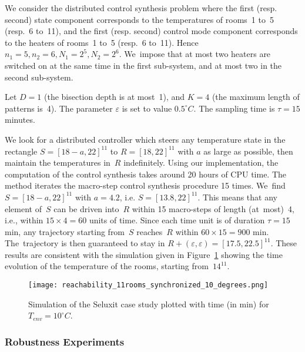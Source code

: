 We consider the distributed control synthesis problem where
the first (resp. second) state component corresponds to 
the temperatures of rooms~1 to~5 (resp.~6 to~11),
and the first (resp. second) control mode component corresponds to the heaters 
of rooms~1 to~5 (resp.~6 to~11).
Hence $n_1=5, n_2=6, N_1=2^5, N_2=2^6$. We~impose
that at most two heaters are switched on at the same time in the
first sub-system, and at most two in the second sub-system.

Let $D=1$ (the bisection depth is at most~1),
and $K=4$ (the maximum length of patterns is~4).
The parameter $\varepsilon$ is set to value $0.5^\circ C$.
The sampling time is $\tau=15$ minutes.


We look for a distributed controller 
which steers any temperature state in
the rectangle $S=[18-a,22]^{11}$
to $R=[18,22]^{11}$ with $a$ as large as possible, 
then maintain the temperatures in~$R$ indefinitely.
%
Using our implementation, the computation of the control synthesis
takes around 20 hours of CPU time.
%
The method iterates the macro-step control synthesis procedure 15
times.  We~find $S=[18-a,22]^{11}$ with $a=4.2$, i.e.
$S=[13.8,22]^{11}$.  This means that any element of~$S$ can be driven
into~$R$ within 15 macro-steps of length (at~most)~4, i.e., within
$15\times 4=60$ units of time.  Since each time unit is of duration
$\tau=15$ min, any trajectory starting from~$S$ reaches~$R$ within
$60\times 15=900$ min.  The~trajectory is then guaranteed to stay in
$R+(\varepsilon,\varepsilon)=[17.5,22.5]^{11}$.
%
These results are consistent with the simulation given in
Figure~\ref{fig:reach_11rooms_10} showing the time evolution of the
temperature of the rooms, starting from~$14^{11}$.




\begin{figure}[t]
  \centering
 \texttt{[image: reachability\_11rooms\_synchronized\_10\_degrees.png]}
 \caption{Simulation of the Seluxit case study 
plotted with time (in min) for $T_{env}=10^{\circ} C$.}
 \label{fig:reach_11rooms_10}
\end{figure}



\subsubsection{Robustness Experiments}\label{sec:robustness}


